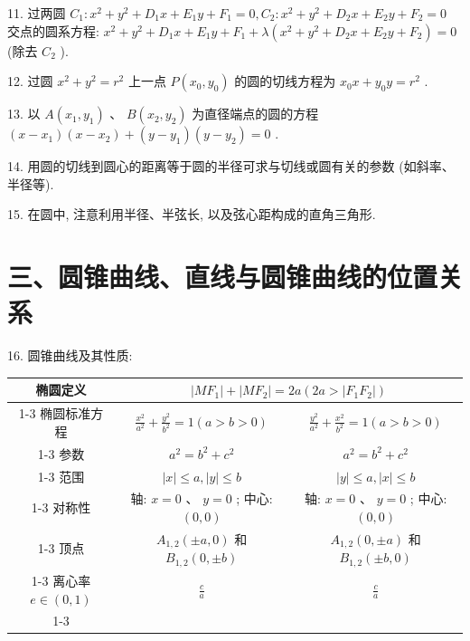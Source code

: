 11. 过两圆 ${C}_{1} : {x}^{2} + {y}^{2} + {D}_{1}x + {E}_{1}y + {F}_{1} = 0,{C}_{2} : {x}^{2} + {y}^{2} + {D}_{2}x + {E}_{2}y + {F}_{2} = 0$ 交点的圆系方程: ${x}^{2} +  {y}^{2} + {D}_{1}x + {E}_{1}y + {F}_{1} + \lambda \left( {{x}^{2} + {y}^{2} + {D}_{2}x + {E}_{2}y + {F}_{2}}\right)  = 0$ (除去 ${C}_{2}$ ).

12. 过圆 ${x}^{2} + {y}^{2} = {r}^{2}$ 上一点 $P\left( {{x}_{0},{y}_{0}}\right)$ 的圆的切线方程为 ${x}_{0}x + {y}_{0}y = {r}^{2}$ .

13. 以 $A\left( {{x}_{1},{y}_{1}}\right)$ 、 $B\left( {{x}_{2},{y}_{2}}\right)$ 为直径端点的圆的方程 $\left( {x - {x}_{1}}\right) \left( {x - {x}_{2}}\right)  + \left( {y - {y}_{1}}\right) \left( {y - {y}_{2}}\right)  = 0$ .

14. 用圆的切线到圆心的距离等于圆的半径可求与切线或圆有关的参数 (如斜率、半径等).

15. 在圆中, 注意利用半径、半弦长, 以及弦心距构成的直角三角形.

\section*{三、圆锥曲线、直线与圆锥曲线的位置关系}

16. 圆锥曲线及其性质:

\begin{center}
\begin{tabular}{|c|c|c|}
\hline
椭圆定义 & \multicolumn{2}{|c|}{$\left| {M{F}_{1}}\right|  + \left| {M{F}_{2}}\right|  = {2a}\left( {{2a} > \left| {{F}_{1}{F}_{2}}\right| }\right)$} \\
\cline{1-3}
椭圆标准方程 & $\frac{{x}^{2}}{{a}^{2}} + \frac{{y}^{2}}{{b}^{2}} = 1\left( {a > b > 0}\right)$ & $\frac{{y}^{2}}{{a}^{2}} + \frac{{x}^{2}}{{b}^{2}} = 1\left( {a > b > 0}\right)$ \\
\cline{1-3}
参数 & ${a}^{2} = {b}^{2} + {c}^{2}$ & ${a}^{2} = {b}^{2} + {c}^{2}$ \\
\cline{1-3}
范围 & $\left| x\right|  \leq  a,\left| y\right|  \leq  b$ & $\left| y\right|  \leq  a,\left| x\right|  \leq  b$ \\
\cline{1-3}
对称性 & 轴: $x = 0\text{ 、 }y = 0$ ; 中心: $\left( {0,0}\right)$ & 轴: $x = 0\text{ 、 }y = 0$ ; 中心: $\left( {0,0}\right)$ \\
\cline{1-3}
顶点 & ${A}_{1,2}\left( {\pm a,0}\right)$ 和 ${B}_{1,2}\left( {0, \pm  b}\right)$ & ${A}_{1,2}\left( {0, \pm  a}\right)$ 和 ${B}_{1,2}\left( {\pm b,0}\right)$ \\
\cline{1-3}
离心率 $e \in  \left( {0,1}\right)$ & $\frac{c}{a}$ & $\frac{c}{a}$ \\
\cline{1-3}
\hline
\end{tabular}
\end{center}

